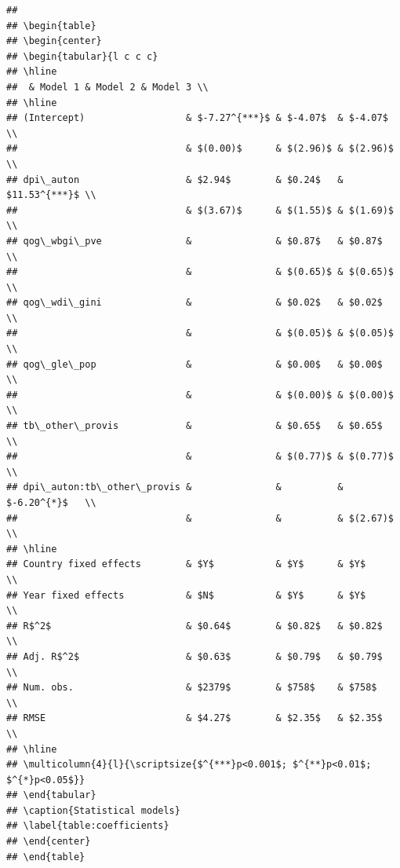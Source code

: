 \documentclass[
]{article}
\begin{document}
\begin{verbatim}
## 
## \begin{table}
## \begin{center}
## \begin{tabular}{l c c c}
## \hline
##  & Model 1 & Model 2 & Model 3 \\
## \hline
## (Intercept)                  & $-7.27^{***}$ & $-4.07$  & $-4.07$       \\
##                              & $(0.00)$      & $(2.96)$ & $(2.96)$      \\
## dpi\_auton                   & $2.94$        & $0.24$   & $11.53^{***}$ \\
##                              & $(3.67)$      & $(1.55)$ & $(1.69)$      \\
## qog\_wbgi\_pve               &               & $0.87$   & $0.87$        \\
##                              &               & $(0.65)$ & $(0.65)$      \\
## qog\_wdi\_gini               &               & $0.02$   & $0.02$        \\
##                              &               & $(0.05)$ & $(0.05)$      \\
## qog\_gle\_pop                &               & $0.00$   & $0.00$        \\
##                              &               & $(0.00)$ & $(0.00)$      \\
## tb\_other\_provis            &               & $0.65$   & $0.65$        \\
##                              &               & $(0.77)$ & $(0.77)$      \\
## dpi\_auton:tb\_other\_provis &               &          & $-6.20^{*}$   \\
##                              &               &          & $(2.67)$      \\
## \hline
## Country fixed effects        & $Y$           & $Y$      & $Y$           \\
## Year fixed effects           & $N$           & $Y$      & $Y$           \\
## R$^2$                        & $0.64$        & $0.82$   & $0.82$        \\
## Adj. R$^2$                   & $0.63$        & $0.79$   & $0.79$        \\
## Num. obs.                    & $2379$        & $758$    & $758$         \\
## RMSE                         & $4.27$        & $2.35$   & $2.35$        \\
## \hline
## \multicolumn{4}{l}{\scriptsize{$^{***}p<0.001$; $^{**}p<0.01$; $^{*}p<0.05$}}
## \end{tabular}
## \caption{Statistical models}
## \label{table:coefficients}
## \end{center}
## \end{table}
\end{verbatim}
\end{document}
